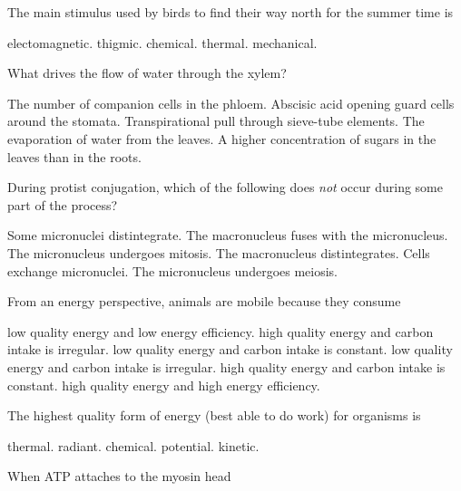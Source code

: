 \question
The main stimulus used by birds to find their way north for the summer time is 
\begin{choices}
\correctchoice electomagnetic.
\choice thigmic. 
\choice chemical. 
\choice thermal. 
\choice mechanical. 
\end{choices}

\question
What drives the flow of water through the xylem?

\begin{choices}
\choice The number of companion cells in the phloem.  
\choice Abscisic acid opening guard cells around the stomata. 
\choice Transpirational pull through sieve-tube elements. 
\correctchoice The evaporation of water from the leaves. 
\choice A higher concentration of sugars in the leaves than in the roots. 
\end{choices}

\question
During protist conjugation, which of the following does \emph{not} occur during some part of the process?

\begin{choices}
\choice Some micronuclei distintegrate. 
\correctchoice The macronucleus fuses with the micronucleus. 
\choice The micronucleus undergoes mitosis. 
\choice The macronucleus distintegrates. 
\choice Cells exchange micronuclei.  
\choice The micronucleus undergoes meiosis. 
\end{choices}


\question
From an energy perspective, animals are mobile because they consume

\begin{choices}
\choice low quality energy and low energy efficiency.
\choice high quality energy and carbon intake is irregular. 
\choice low quality energy and carbon intake is constant. 
\correctchoice low quality energy and carbon intake is irregular.
\choice high quality energy and carbon intake is constant. 
\choice high quality energy and high energy efficiency. 
\end{choices}

\newpage

\question
The highest quality form of energy (best able to do work) for organisms is

\begin{choices}
\choice thermal.
\correctchoice radiant. 
\choice chemical. 
\choice potential. 
\choice kinetic. 
\end{choices}

\question
When ATP attaches to the myosin head

